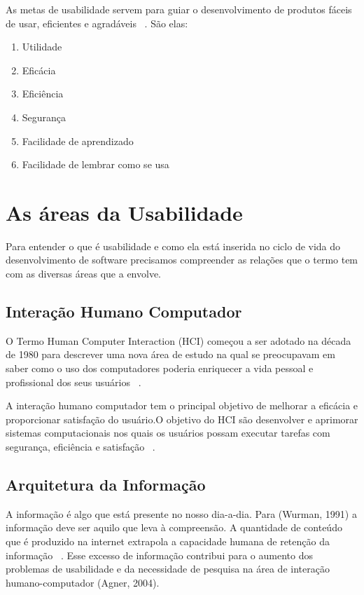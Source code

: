 	As metas de usabilidade servem para guiar o desenvolvimento de produtos fáceis de usar, eficientes e agradáveis ~\cite{preece2007}. São elas:

\begin{enumerate}
\item Utilidade
\item Eficácia
\item Eficiência
\item Segurança
\item Facilidade de aprendizado
\item Facilidade de lembrar como se usa
\end{enumerate}


\section{As áreas da Usabilidade}

	Para entender o que é usabilidade e como ela está inserida no ciclo de vida do desenvolvimento de software precisamos compreender as relações que o termo tem com as diversas áreas que a envolve. 

\subsection{Interação Humano Computador}

	O Termo Human Computer Interaction  (HCI) começou a ser adotado na década de 1980 para descrever uma nova área de estudo na qual se preocupavam em saber como o uso dos computadores poderia enriquecer a vida pessoal e profissional dos seus usuários ~\cite{moraes2002}.
 
	A interação humano computador tem o principal objetivo de melhorar a eficácia e proporcionar satisfação do usuário.O objetivo do HCI são desenvolver e aprimorar sistemas computacionais nos quais os usuários possam executar tarefas com segurança, eficiência e satisfação ~\cite{preece2007}.
	
\subsection{Arquitetura da Informação}

A informação é algo que está presente no nosso dia-a-dia. Para (Wurman, 1991) a informação deve ser aquilo que leva à compreensão. A quantidade de conteúdo que é produzido na internet extrapola a capacidade humana de retenção da informação ~\cite{rosa2012}. Esse excesso de informação contribui para o aumento dos problemas de usabilidade e da necessidade de pesquisa na área de interação humano-computador (Agner, 2004).

